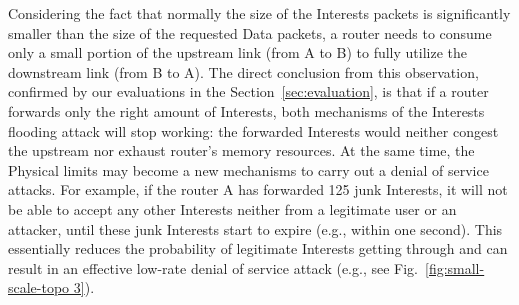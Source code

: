Considering the fact that normally the size of the Interests packets is significantly smaller than the size of the requested Data packets, a router needs to consume only a small portion of the upstream link (from A to B) to fully utilize the downstream link (from B to A).
The direct conclusion from this observation, confirmed by our evaluations in the Section~\ref{sec:evaluation}, is that if a router forwards only the right amount of Interests, both mechanisms of the Interests flooding attack will stop working: the forwarded Interests would neither congest the upstream nor exhaust router's memory resources.
At the same time, the Physical limits may become a new mechanisms to carry out a denial of service attacks.
For example, if the router A has forwarded 125 junk Interests, it will not be able to accept any other Interests neither from a legitimate user or an attacker, until these junk Interests start to expire (e.g., within one second).
This essentially reduces the probability of legitimate Interests getting through and can result in an effective low-rate denial of service attack (e.g., see Fig.~\ref{fig:small-scale-topo 3}).



